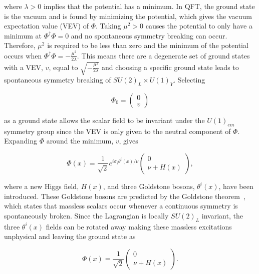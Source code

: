 \noindent
where $\lambda>0$ implies that the potential has a minimum. In QFT, the ground state is the vacuum and is found by minimizing the potential, which gives the vacuum expectation value (VEV) of $\Phi$. Taking $\mu^{2}>0$ causes the potential to only have a minimum at $\Phi^{\dag}\Phi=0$ and no spontaneous symmetry breaking can occur. Therefore, $\mu^{2}$ is required to be less than zero and the minimum of the potential occurs when $\Phi^{\dag}\Phi=-\frac{\mu^{2}}{2\lambda}$. This means there are a degenerate set of ground states with a VEV, $v$, equal to $\sqrt{-\frac{\mu^{2}}{2\lambda}}$ and choosing a specific ground state leads to spontaneous symmetry breaking of $SU(2)_{L}\times U(1)_{Y}$. Selecting 

\begin{equation}
\Phi_{0} =
\begin{pmatrix}
0\\
v
\end{pmatrix}
\end{equation}

\noindent
as a ground state allows the scalar field to be invariant under the $U(1)_{em}$ symmetry group since the VEV is only given to the neutral component of $\Phi$. Expanding $\Phi$ around the minimum, $v$, gives

\begin{equation}
\Phi(x) = \frac{1}{\sqrt{2}} e^{i\sigma_{i}\theta^{i}(x)/\nu}
\begin{pmatrix}
0\\
\nu+H(x)
\end{pmatrix},
\end{equation}

\noindent
where a new Higgs field, $H(x)$, and three Goldstone bosons, $\theta^{i}(x)$, have been introduced. These Goldstone bosons are predicted by the Goldstone theorem~\cite{GoldstoneThm}, which states that massless scalars occur whenever a continuous symmetry is spontaneously broken. Since the Lagrangian is locally $SU(2)_{L}$ invariant, the three $\theta^{i}(x)$ fields can be rotated away making these massless excitations unphysical and leaving the ground state as

\begin{equation}
\label{eq:GroundSt}
\Phi(x) = \frac{1}{\sqrt{2}}
\begin{pmatrix}
0\\
\nu+H(x)
\end{pmatrix}.
\end{equation}

